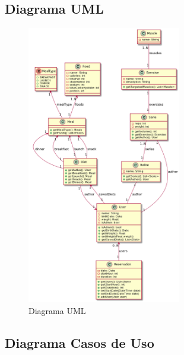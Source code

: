 \documentclass[12pt,a4paper]{article}
\begin{document}
\clearpage


\subsection{Diagrama UML}

\begin{figure}[h]
 	\centering
	\includegraphics[width=0.6\textwidth]{uml}
	\caption{Diagrama UML}
\end{figure}

\newpage

\subsection{Diagrama Casos de Uso}
\end{document}

